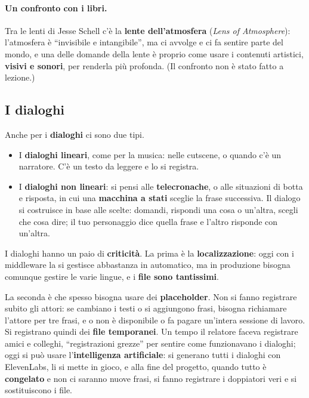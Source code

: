 \paragraph{Un confronto con i libri.} Tra le lenti di Jesse Schell c'è la
\textbf{lente dell'atmosfera} (\emph{Lens of Atmosphere}): l'atmosfera è
``invisibile e intangibile'', ma ci avvolge e ci fa sentire parte del mondo, e una
delle domande della lente è proprio come usare i contenuti artistici,
\textbf{visivi e sonori}, per renderla più profonda. (Il confronto non è stato
fatto a lezione.)

\subsection{I dialoghi}

Anche per i \textbf{dialoghi} ci sono due tipi.
\begin{itemize}
  \item I \textbf{dialoghi lineari}, come per la musica: nelle cutscene, o
        quando c'è un narratore. C'è un testo da leggere e lo si registra.
  \item I \textbf{dialoghi non lineari}: si pensi alle \textbf{telecronache}, o
        alle situazioni di botta e risposta, in cui una \textbf{macchina a
        stati} sceglie la frase successiva. Il dialogo si costruisce in base
        alle scelte: domandi, rispondi una cosa o un'altra, scegli che cosa dire;
        il tuo personaggio dice quella frase e l'altro risponde con un'altra.
\end{itemize}

I dialoghi hanno un paio di \textbf{criticità}. La prima è la
\textbf{localizzazione}: oggi con i middleware la si gestisce abbastanza in
automatico, ma in produzione bisogna comunque gestire le varie lingue, e i
\textbf{file sono tantissimi}.

La seconda è che spesso bisogna usare dei \textbf{placeholder}. Non si fanno
registrare subito gli attori: se cambiano i testi o si aggiungono frasi, bisogna
richiamare l'attore per tre frasi, e o non è disponibile o fa pagare un'intera
sessione di lavoro. Si registrano quindi dei \textbf{file temporanei}. Un tempo
il relatore faceva registrare amici e colleghi, ``registrazioni grezze'' per
sentire come funzionavano i dialoghi; oggi si può usare l'\textbf{intelligenza
artificiale}: si generano tutti i dialoghi con ElevenLabs, li si mette in gioco,
e alla fine del progetto, quando tutto è \textbf{congelato} e non ci saranno
nuove frasi, si fanno registrare i doppiatori veri e si sostituiscono i file.

